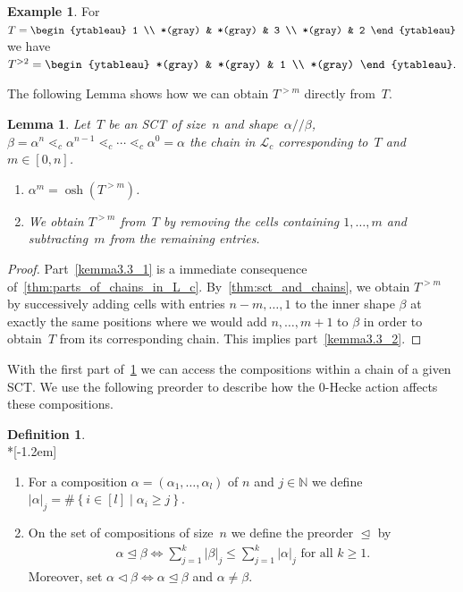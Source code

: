 \documentclass[10pt]{amsart}
\theoremstyle{plain}
\theoremstyle{plain}
\newtheorem{lemma}[lemma]{Lemma}
\theoremstyle{plain}
\theoremstyle{plain}
\theoremstyle{plain}
\theoremstyle{definition}
\newtheorem{defi}[defi]{Definition}
\theoremstyle{definition}
\newtheorem{exam}[exam]{Example}
\newcommand{\N}{\mathbb N}
\DeclareMathOperator{\osh}{osh}
\newcommand{\ab}{{\alpha / \! \! / \beta}}
\newcommand{\parts}[2]{{(#1_1, \ldots, #1_{#2})}}
\newcommand{\dleq}{\trianglelefteq}
\newcommand{\dlneq}{\vartriangleleft}
\begin{document}
\begin{exam}
	For 
	$T=\begin{ytableau}
	1 \\
	*(gray) & *(gray) & 3 \\
	*(gray) & 2
	\end{ytableau}$ 
	we have
	$ 
	T^{>2} = \begin{ytableau} 
	*(gray) & *(gray) & 1 \\
	*(gray) \end{ytableau}.
	$	
\end{exam}

The following Lemma shows how we can obtain $T^{>m}$ directly from~$T$.

\begin{lemma}
	\label{thm:cells_and_entries_of_restricted_tableaux}
	Let~$T$ be an SCT of size~$n$ and shape~$\ab$, $\beta = \alpha^n \lessdot_c \alpha^{n-1} \lessdot_c \cdots \lessdot_c \alpha^0 = \alpha$ the chain in $\mathcal{L}_c$ corresponding to~$T$ and $m\in [0,n]$.
	\begin{enumerate}
		\item\label{kemma3.3_1}	
		$\alpha^m = \osh(T^{>m})$.
		\item\label{kemma3.3_2} We obtain $T^{>m}$ from~$T$ by removing the cells containing $1,\dots, m$ and subtracting~$m$ from the remaining entries.
	\end{enumerate}
\end{lemma}

	\begin{proof}
		Part~\eqref{kemma3.3_1} is a immediate consequence of~\cref{thm:parts_of_chains_in_L_c}. 	
		By~\cref{thm:sct_and_chains}, we obtain $T^{>m}$ by successively adding cells with entries $n-m,\dots, 1$ to the inner shape $\beta$ at exactly the same positions where we would add $n,\dots, m+1$ to $\beta$ in order to obtain~$T$ from its corresponding chain. This implies part~\eqref{kemma3.3_2}.
	\end{proof}

With the first part of~\cref{thm:cells_and_entries_of_restricted_tableaux} we can access the compositions within a chain of a given SCT. We use the following preorder to describe how the 0-Hecke action affects these compositions.

\begin{defi}\ \\*[-1.2em]

	\begin{enumerate}
		\item For a composition $\alpha = \parts{\alpha}{l}$ of $n$ and $j\in \N$ we define $|\alpha|_j = \# \left\{ i \in [l] \mid \alpha_i\geq j \right\}$. 
		\item
		 On the set of compositions of size~$n$ we define the preorder $\dleq$ by
		\begin{align*}
			\alpha \dleq \beta \iff \sum_{j=1}^k |\beta|_j \leq \sum_{j=1}^k |\alpha|_j \text{ for all $k \geq 1$.}
		\end{align*} 
		 Moreover, set $\alpha \dlneq \beta \iff \alpha \dleq \beta$ and $\alpha \neq \beta$.
	\end{enumerate}
\end{defi}
\end{document}

